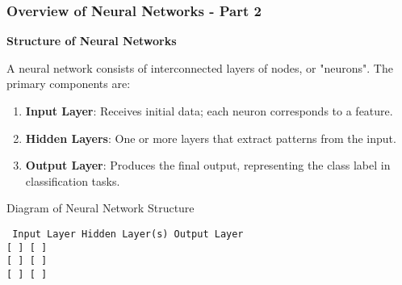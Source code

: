 \documentclass[aspectratio=169]{beamer}
\begin{document}
\begin{frame}[fragile]
    \frametitle{Overview of Neural Networks - Part 2}
    
    \textbf{Structure of Neural Networks}
    
    A neural network consists of interconnected layers of nodes, or "neurons". The primary components are:
    
    \begin{enumerate}
        \item \textbf{Input Layer}: Receives initial data; each neuron corresponds to a feature.
        \item \textbf{Hidden Layers}: One or more layers that extract patterns from the input. 
        \item \textbf{Output Layer}: Produces the final output, representing the class label in classification tasks.
    \end{enumerate}
    
    \begin{block}{Diagram of Neural Network Structure}
    \begin{center}
    \small
    \texttt{
       Input Layer      Hidden Layer(s)         Output Layer \\
           [ ]                [ ]                    [ ] \\
           [ ]                [ ]                    [ ] \\
           [ ]                [ ]                    [ ] \\
    }
    \end{center}
    \end{block}
\end{frame}
\end{document}
